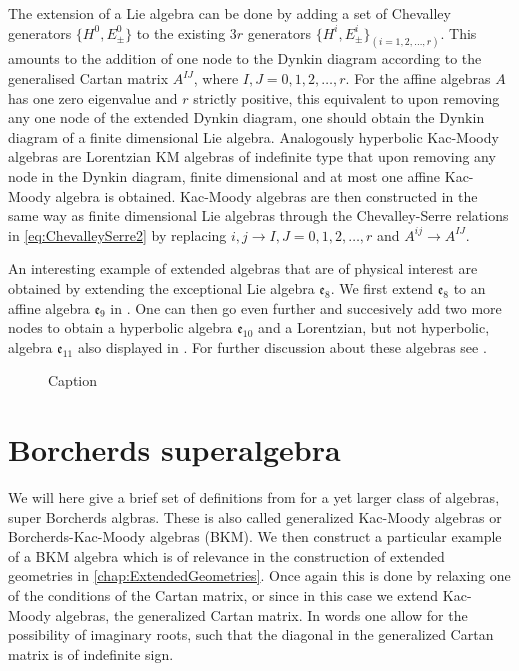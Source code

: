 The extension of a Lie algebra can be done by adding a set of Chevalley generators $\{H^0,E_{\pm}^0\}$ to the existing $3r$ generators $\{H^i,E_\pm^i\}_{(i=1,2,\ldots,r)}$. This amounts to the addition of one node to the Dynkin diagram according to the generalised Cartan matrix $A^{IJ}$, where $I,J=0,1,2,\ldots, r$. For the affine algebras $A$ has one zero eigenvalue and $r$ strictly positive, this equivalent to upon removing any one node of the extended Dynkin diagram, one should obtain the Dynkin diagram of a finite dimensional Lie algebra. Analogously hyperbolic Kac-Moody algebras are Lorentzian KM algebras of indefinite type that upon removing any node in the Dynkin diagram, finite dimensional and at most one affine Kac-Moody algebra is obtained. Kac-Moody algebras are then constructed in the same way as finite dimensional Lie algebras through the Chevalley-Serre relations in \eqref{eq:ChevalleySerre2} by replacing $i,j\to I,J=0,1,2,\ldots,r$ and $A^{ij}\to A^{IJ}$.

An interesting example of extended algebras that are of physical interest are obtained by extending the exceptional Lie algebra $\mathfrak{e}_8$. We first extend $\mathfrak{e}_8$ to an affine algebra $\mathfrak{e}_9$ in . One can then go even further and succesively add two more nodes to obtain a hyperbolic algebra $\mathfrak{e}_{10}$ and a Lorentzian, but not hyperbolic, algebra $\mathfrak{e}_{11}$ also displayed in . For further discussion about these algebras see \cite{PhdJakob2009,PhdDaniel2010}.
\begin{figure}
    \caption{Caption}
    \label{fig:DynkinEseries}
\end{figure}


\section{Borcherds superalgebra}\label{sec:Borcherds}

We will here give a brief set of definitions from \cite{Ray2006} for a yet larger class of algebras, super Borcherds algbras. These is also called generalized Kac-Moody algebras or Borcherds-Kac-Moody algebras (BKM). We then construct a particular example of a BKM algebra which is of relevance in the construction of extended geometries in \ref{chap:ExtendedGeometries}. Once again this is done by relaxing one of the conditions of the Cartan matrix, or since in this case we extend Kac-Moody algebras, the generalized Cartan matrix. In words one allow for the possibility of imaginary roots, such that the diagonal in the generalized Cartan matrix is of indefinite sign.

